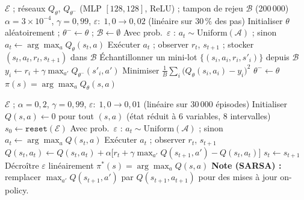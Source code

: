 \documentclass[11pt,a4paper]{article}
\begin{document}
\begin{algorithm}[H]
\caption{DQN pour le dispatching de camions miniers}
\label{alg:dqn}
\begin{algorithmic}[1]
\Require $\mathcal{E}$ ; réseaux $Q_\theta$, $Q_{\theta^-}$ (MLP $[128,128]$, ReLU) ; tampon de rejeu $\mathcal{B}$ (200\,000)
\Require $\alpha{=}3{\times}10^{-4}$, $\gamma{=}0{,}99$, $\varepsilon{:}\;1{,}0\!\to\!0{,}02$ (linéaire sur $30\,\%$ des pas)
\State Initialiser $\theta$ aléatoirement ; $\theta^-\leftarrow\theta$ ; $\mathcal{B}\leftarrow\emptyset$
  \State Avec prob.\ $\varepsilon$ : $a_t\sim\text{Uniform}(\mathcal{A})$ ; sinon $a_t\leftarrow\arg\max_a Q_\theta(s_t,a)$
  \State Exécuter $a_t$ ; observer $r_t$, $s_{t+1}$ ; stocker $(s_t,a_t,r_t,s_{t+1})$ dans $\mathcal{B}$
  \State Échantillonner un mini-lot $\{(s_i,a_i,r_i,s'_i)\}$ depuis $\mathcal{B}$
  \State $y_i \leftarrow r_i + \gamma\max_{a'}Q_{\theta^-}(s'_i,a')$ 
  \State Minimiser $\frac{1}{B}\sum_i\bigl(Q_\theta(s_i,a_i)-y_i\bigr)^2$
   $\theta^-\leftarrow\theta$ \EndIf {}
\EndFor
\Ensure $\pi(s)=\arg\max_a Q_\theta(s,a)$
\end{algorithmic}
\end{algorithm}

\begin{algorithm}[H]
\caption{Q-Learning pour le dispatching de camions miniers (référence tabulaire)}
\label{alg:qlearning}
\begin{algorithmic}[1]
\Require $\mathcal{E}$ ; $\alpha{=}0{,}2$, $\gamma{=}0{,}99$, $\varepsilon{:}\;1{,}0\!\to\!0{,}01$ (linéaire sur 30\,000 épisodes)
\State Initialiser $Q(s,a)\leftarrow 0$ pour tout $(s,a)$
        (état réduit à 6 variables, 8 intervalles)
  \State $s_0\leftarrow\texttt{reset}(\mathcal{E})$
    \State Avec prob.\ $\varepsilon$ : $a_t\sim\text{Uniform}(\mathcal{A})$ ; sinon $a_t\leftarrow\arg\max_a Q(s_t,a)$
    \State Exécuter $a_t$ ; observer $r_t$, $s_{t+1}$
    \State $Q(s_t,a_t)\leftarrow Q(s_t,a_t)+\alpha\bigl[r_t+\gamma\max_{a'}Q(s_{t+1},a')-Q(s_t,a_t)\bigr]$
    \State $s_t\leftarrow s_{t+1}$
  \EndWhile
  \State Décroître $\varepsilon$ linéairement
\EndFor
\Ensure $\pi^*(s)=\arg\max_a Q(s,a)$
\Statex \textbf{Note (SARSA) :} remplacer $\max_{a'}Q(s_{t+1},a')$ par $Q(s_{t+1},a_{t+1})$ pour des mises à jour on-policy.
\end{algorithmic}
\end{algorithm}
\end{document}

